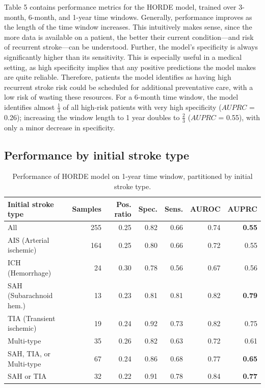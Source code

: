 \documentclass{article}
\begin{document}
Table 5 contains performance metrics for the HORDE model, trained over 3-month, 6-month, and 1-year time windows. Generally, performance improves as the length of the time window increases. This intuitively makes sense, since the more data is available on a patient, the better their current condition---and risk of recurrent stroke---can be understood. Further, the model's specificity is always significantly higher than its sensitivity. This is especially useful in a medical setting, as high specificity implies that any positive predictions the model makes are quite reliable. Therefore, patients the model identifies as having high recurrent stroke risk could be scheduled for additional preventative care, with a low risk of wasting these resources. For a 6-month time window, the model identifies almost $\frac{1}{3}$ of all high-risk patients with very high specificity ($AUPRC$ = 0.26); increasing the window length to 1 year doubles to $\frac{2}{3}$ ($AUPRC$ = 0.55), with only a minor decrease in specificity.


\subsection{Performance by initial stroke type}


\begin{table}
    \caption{
      Performance of HORDE model on 1-year time window, partitioned by initial stroke type.
    }
    \label{tab:exp}
    \centering
    \centering
    \label{tab:exp-synth}
    \begin{small}
    \begin{sc}
    \begin{tabular}{lrrrrrr}
    \toprule
    Initial stroke type & Samples & Pos. ratio & Spec. & Sens. & AUROC & AUPRC \\
    \toprule
    All        & 255 & 0.25 & 0.82 & 0.66 & 0.74 & \textbf{0.55} \\
    \midrule
    AIS (Arterial ischemic)       & 164 & 0.25 & 0.80 & 0.66 & 0.72 & 0.55  \\
    ICH (Hemorrhage)        & 24 & 0.30 & 0.78 & 0.56 & 0.67 & 0.56 \\
    SAH (Subarachnoid hem.)        & 13 & 0.23 & 0.81 & 0.81 & 0.82 & \textbf{0.79}\\
    TIA (Transient ischemic)        & 19 & 0.24 & 0.92 & 0.73 & 0.82 & 0.75 \\
    Multi-type & 35 & 0.26 & 0.82 & 0.63 & 0.72 & 0.61 \\
    \midrule
    SAH, TIA, or Multi-type & 67 & 0.24 & 0.86 & 0.68 & 0.77 & \textbf{0.65} \\
    SAH or TIA & 32 & 0.22 & 0.91 & 0.78 & 0.84 & \textbf{0.77}\\
    \bottomrule
    \end{tabular}
    \end{sc}
    \end{small}
\end{table}
\end{document}
